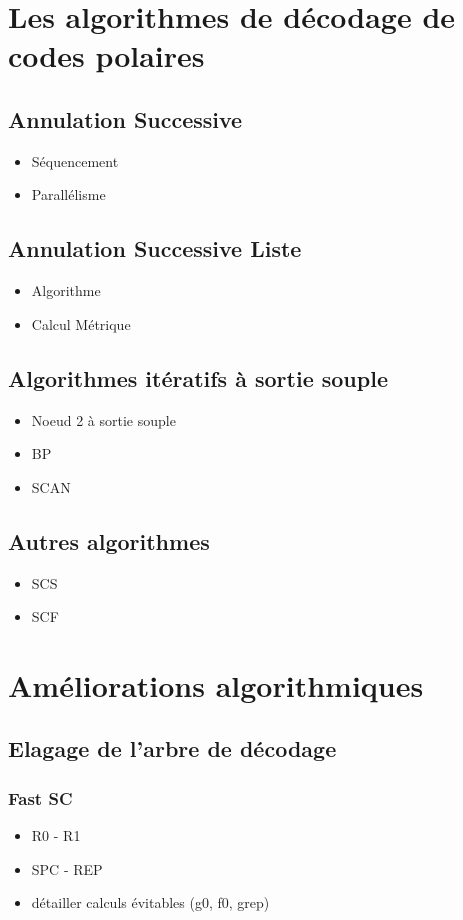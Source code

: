 \section{Les algorithmes de décodage de codes polaires}

\subsection{Annulation Successive}
\begin{itemize}
\item Séquencement
\item Parallélisme
\end{itemize}
\subsection{Annulation Successive Liste}
\begin{itemize}
\item Algorithme
\item Calcul Métrique

\end{itemize}
\subsection{Algorithmes itératifs à sortie souple}
\begin{itemize}
\item Noeud 2 à sortie souple
\item BP
\item SCAN
\end{itemize}

\subsection{Autres algorithmes}
\begin{itemize}
	\item SCS
	\item SCF
\end{itemize}
\section{Améliorations algorithmiques}

\subsection{Elagage de l'arbre de décodage}

\subsubsection{Fast SC}
\begin{itemize}
\item R0 - R1
\item SPC - REP
\item détailler calculs évitables (g0, f0, grep)
\end{itemize}
